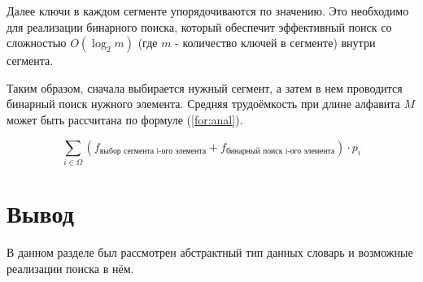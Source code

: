 Далее ключи в каждом сегменте упорядочиваются по значению. Это необходимо для реализации бинарного поиска, который обеспечит эффективный поиск со сложностью $O(\log_2 m)$ (где $m$ - количество ключей в сегменте) внутри сегмента.

Таким образом, сначала выбирается нужный сегмент, а затем в нем проводится бинарный поиск нужного элемента. Средняя трудоёмкость при длине алфавита $M$ может быть рассчитана по формуле (\ref{for:anal}). 

\begin{equation}
    \label{for:anal}
    \sum_{i \in \Omega}{\left(f_{\text{выбор сегмента i-ого элемента}} + f_{\text{бинарный поиск i-ого элемента}}\right)} \cdot p_i
\end{equation}


\section*{Вывод}
В данном разделе был рассмотрен абстрактный тип данных словарь и возможные реализации поиска в нём.
